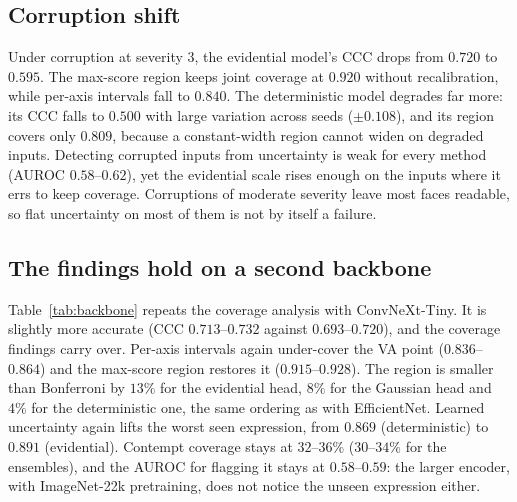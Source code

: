 \begin{table}[h]
  \centering\small
  \resizebox{\linewidth}{!}{}
  \caption{Restoring coverage on a held-out expression from $k$ of its labelled
  faces (evidential head, nominal $90\%$). None: max-score coverage without
  recalibration (Table~\ref{tab:loeo}). Group: a separate max-score threshold
  for the expression. +shift: half of the $k$ faces estimate and remove the
  expression's mean VA offset, the other half calibrate. Each cell is joint
  coverage in \% on the remaining faces of the expression and, in parentheses,
  median region area relative to the mean region of the seen expressions. Mean
  over three seeds and $200$ draws; -- where fewer than $20$ faces would remain.}
  \label{tab:recal}
\end{table}

\subsection{Corruption shift}
Under corruption at severity $3$, the evidential model's CCC drops from $0.720$
to $0.595$. The max-score region keeps joint coverage at $0.920$ without
recalibration, while per-axis intervals fall to $0.840$. The deterministic model
degrades far more: its CCC falls to $0.500$ with large variation across seeds
($\pm0.108$), and its region covers only $0.809$, because a constant-width region
cannot widen on degraded inputs. Detecting corrupted inputs from uncertainty is
weak for every method (AUROC $0.58$--$0.62$), yet the evidential scale rises
enough on the inputs where it errs to keep coverage. Corruptions of moderate
severity leave most faces readable, so flat uncertainty on most of them is not
by itself a failure.

\subsection{The findings hold on a second backbone}
\label{sec:backbone}
Table~\ref{tab:backbone} repeats the coverage analysis with ConvNeXt-Tiny. It is
slightly more accurate (CCC $0.713$--$0.732$ against $0.693$--$0.720$), and the
coverage findings carry over. Per-axis intervals again under-cover the VA point
($0.836$--$0.864$) and the max-score region restores it ($0.915$--$0.928$). The
region is smaller than Bonferroni by $13\%$ for the evidential head, $8\%$ for the
Gaussian head and $4\%$ for the deterministic one, the same ordering as with
EfficientNet. Learned uncertainty again lifts the worst seen expression, from
$0.869$ (deterministic) to $0.891$ (evidential). Contempt coverage stays at
$32$--$36\%$ ($30$--$34\%$ for the ensembles), and the AUROC for flagging it stays
at $0.58$--$0.59$: the larger encoder, with ImageNet-22k pretraining, does not
notice the unseen expression either.

